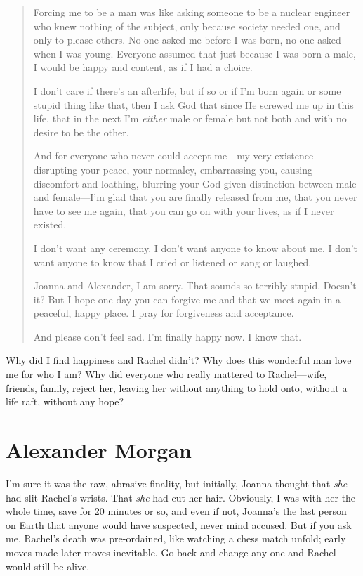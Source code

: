 \begin{quote}
Forcing me to be a man was like asking someone to be a nuclear engineer
who knew nothing of the subject, only because society needed one, and
only to please others. No one asked me before I was born, no one asked
when I was young. Everyone assumed that just because I was born a male,
I would be happy and content, as if I had a choice.

I don't care if there's an afterlife, but if so or if I'm born again or
some stupid thing like that, then I ask God that since He screwed me up
in this life, that in the next I'm \emph{either} male or female but not
both and with no desire to be the other.

And for everyone who never could accept me---my very existence
disrupting your peace, your normalcy, embarrassing you, causing
discomfort and loathing, blurring your God-given distinction between
male and female---I'm glad that you are finally released from me, that
you never have to see me again, that you can go on with your lives, as
if I never existed.

I don't want any ceremony. I don't want anyone to know about me. I don't
want anyone to know that I cried or listened or sang or laughed.

Joanna and Alexander, I am sorry. That sounds so terribly stupid.
Doesn't it? But I hope one day you can forgive me and that we meet again
in a peaceful, happy place. I pray for forgiveness and acceptance.

And please don't feel sad. I'm finally happy now. I know that.
\end{quote}

\noindent Why did I find happiness and Rachel didn't? Why does this
wonderful man love me for who I am? Why did everyone who really mattered
to Rachel---wife, friends, family, reject her, leaving her without
anything to hold onto, without a life raft, without any hope?

\chapter{Alexander Morgan}

\titlemark

I'm sure it was the raw, abrasive finality, but initially, Joanna
thought that \emph{she} had slit Rachel's wrists. That \emph{she} had
cut her hair. Obviously, I was with her the whole time, save for 20
minutes or so, and even if not, Joanna's the last person on Earth that
anyone would have suspected, never mind accused. But if you ask me,
Rachel's death was pre-ordained, like watching a chess match unfold;
early moves made later moves inevitable. Go back and change any one and
Rachel would still be alive.

